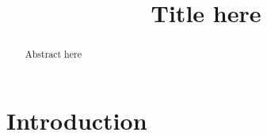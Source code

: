 \documentclass[a4paper, 11pt]{article}
\begin{document}
\title{Title here }
\author{}
\date{}

\maketitle

\begin{abstract}
Abstract here
\end{abstract}



\overfullrule=0pt


\section{Introduction}
\label{sec:intro}






\end{document}
